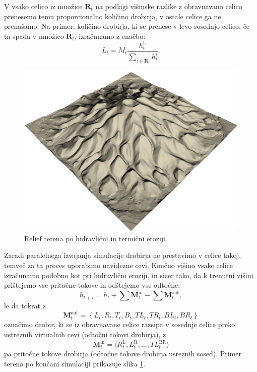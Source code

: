 \documentclass[9pt]{pnas-new}
\newcommand{\set}[1]{\ensuremath{\mathbf{#1}}}
\begin{document}
V vsako celico iz množice $\set{R}_t$ na podlagi višinske razlike z obravnavano celico prenesemo temu proporcionalno količino drobirja, v ostale celice ga ne prenašamo. Na primer: količino drobirja, ki se prenese v levo sosednjo celico, če ta spada v množico $\set{R}_t$, izračunamo z enačbo:
\begin{equation}
L_t = M_t \frac{h^\mathrm{L}_t}{\sum_{i \in \set{R}_t}h^i_t}.
\end{equation}

\begin{figure}
	\centering
	\includegraphics[width=.8\linewidth]{example_erosion_screen}
	\caption{Relief terena po hidravlični in termični eroziji.}
	\label{fig:finished_erosion}
\end{figure}

Zaradi paralelnega izvajanja simulacije drobirja ne prestavimo v celice takoj, temveč za ta proces uporabimo navidezne cevi. Končno višino vsake celice izračunamo podobno kot pri hidravlični eroziji, in sicer tako, da k trenutni višini prištejemo vse pritočne tokove in odštejemo vse odtočne:
\begin{equation}
h_{t+\tau} = h_t + \sum \set{M}^\mathrm{in}_t - \sum \set{M}^\mathrm{out}_t,
\end{equation}
le da tokrat z
$$\set{M}^\mathrm{out}_t=\left\{ L_t,R_t,T_t,B_t,\mathit{TL}_t,\mathit{TR}_t,\mathit{BL}_t,\mathit{BR}_t \right\}$$
označimo drobir, ki se iz obravnavane celice razsipa v sosednje celice preko ustreznih virtualnih cevi (odtočni tokovi drobirja), z $$\set{M}^\mathrm{in}_t=\langle R^\mathrm{L}_t, L^\mathrm{R}_t,\ldots,\mathit{TL}^\mathrm{BR}_t \rangle$$
pa pritočne tokove drobirja (odtočne tokove drobirja usreznih sosed). Primer terena po končani simulaciji prikazuje slika \ref{fig:finished_erosion}.
\end{document}
